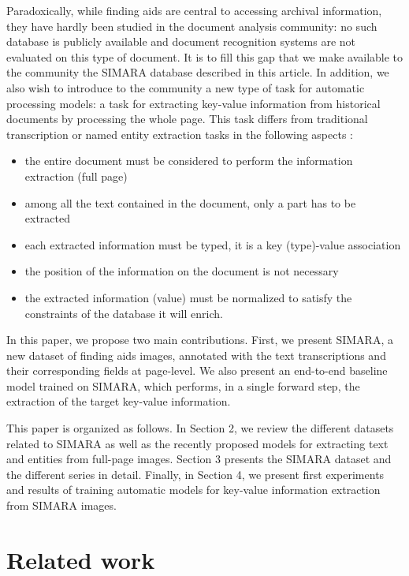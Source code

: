 \documentclass[runningheads]{llncs}
\begin{document}
Paradoxically, while finding aids are central to accessing archival information, they have hardly been studied in the document analysis community: no such database is publicly available and document recognition systems are not evaluated on this type of document. It is to fill this gap that we make available to the community the SIMARA database described in this article. In addition, we also wish to introduce to the community a new type of task for automatic processing models: a task for extracting key-value information from historical documents by processing the whole page. This task differs from traditional transcription or named entity extraction tasks in the following aspects :
\begin{itemize}
    \item the entire document must be considered to perform the information extraction (full page)
    \item among all the text contained in the document, only a part has to be extracted
    \item each extracted information must be typed, it is a key (type)-value association
    \item the position of the information on the document is not necessary
    \item the extracted information (value) must be normalized to satisfy the constraints of the database it will enrich.
\end{itemize}

In this paper, we propose two main contributions. First, we present SIMARA, a new dataset of finding aids images, annotated with the text transcriptions and their corresponding fields at page-level. We also present an end-to-end baseline model trained on SIMARA, which performs, in a single forward step, the extraction of the target key-value information.

This paper is organized as follows. In Section 2, we review the different datasets related to SIMARA as well as the recently proposed models for extracting text and entities from full-page images. Section 3 presents the SIMARA dataset and the different series in detail. Finally, in Section 4, we present first experiments and results of training automatic models for key-value information extraction from SIMARA images.





\section{Related work}
\end{document}
